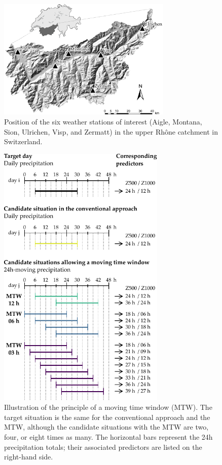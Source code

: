 \documentclass[hess, manuscript]{copernicus}
\begin{document}
	
	
	
	
	
	
	
	
	
	\begin{figure}[htb]
		\begin{center}
			\includegraphics[width=8.3cm]{fig01.pdf}
		\end{center}
		\caption{Position of the six weather stations of interest (Aigle, Montana, Sion, Ulrichen, Visp, and Zermatt) in the upper Rh\^{o}ne catchment in Switzerland.}
		\label{fig:map}
	\end{figure}
	
	\begin{figure}[htb]
		\begin{center}
			\includegraphics[width=8cm]{fig02.pdf}
		\end{center}
		\caption{Illustration of the principle of a moving time window (MTW). The target situation is the same for the conventional approach and the MTW, although the candidate situations with the MTW are two, four, or eight times as many. The horizontal bars represent the 24h precipitation totals; their associated predictors are listed on the right-hand side.}
		\label{fig:principle}
	\end{figure}
	
\end{document}
